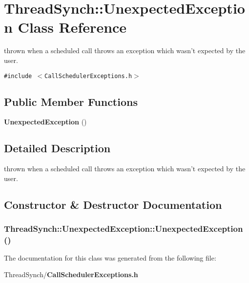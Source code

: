 \section{Thread\-Synch::Unexpected\-Exception Class Reference}
\label{class_thread_synch_1_1_unexpected_exception}
thrown when a scheduled call throws an exception which wasn't expected by the user.  


{\tt \#include $<$Call\-Scheduler\-Exceptions.h$>$}

\subsection*{Public Member Functions}
\begin{CompactItemize}
\item 
{\bf Unexpected\-Exception} ()
\end{CompactItemize}


\subsection{Detailed Description}
thrown when a scheduled call throws an exception which wasn't expected by the user. 



\subsection{Constructor \& Destructor Documentation}
\subsubsection{\setlength{\rightskip}{0pt plus 5cm}Thread\-Synch::Unexpected\-Exception::Unexpected\-Exception ()\hspace{0.3cm}{\tt  [inline]}}\label{class_thread_synch_1_1_unexpected_exception_98601b3ba5bc4a26ee92713e386744ee}




The documentation for this class was generated from the following file:\begin{CompactItemize}
\item 
Thread\-Synch/{\bf Call\-Scheduler\-Exceptions.h}\end{CompactItemize}

